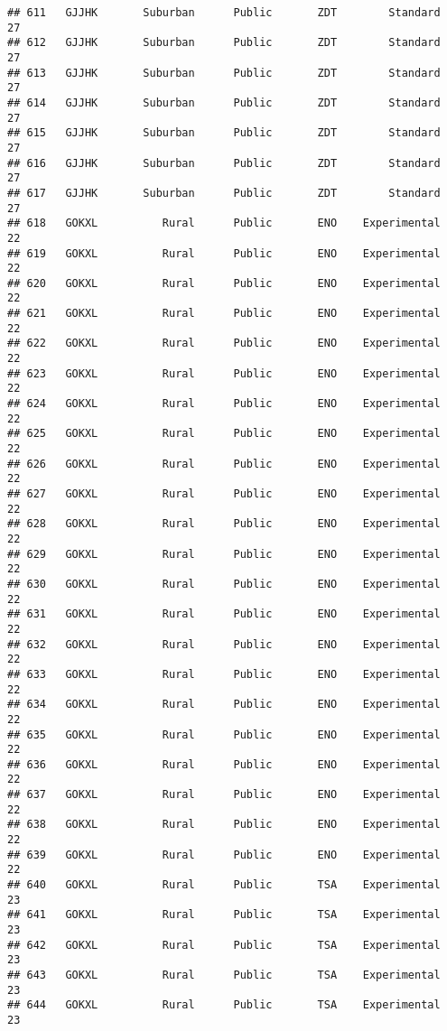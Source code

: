 \documentclass[
]{article}
\begin{document}
\begin{verbatim}
## 611   GJJHK       Suburban      Public       ZDT        Standard        27
## 612   GJJHK       Suburban      Public       ZDT        Standard        27
## 613   GJJHK       Suburban      Public       ZDT        Standard        27
## 614   GJJHK       Suburban      Public       ZDT        Standard        27
## 615   GJJHK       Suburban      Public       ZDT        Standard        27
## 616   GJJHK       Suburban      Public       ZDT        Standard        27
## 617   GJJHK       Suburban      Public       ZDT        Standard        27
## 618   GOKXL          Rural      Public       ENO    Experimental        22
## 619   GOKXL          Rural      Public       ENO    Experimental        22
## 620   GOKXL          Rural      Public       ENO    Experimental        22
## 621   GOKXL          Rural      Public       ENO    Experimental        22
## 622   GOKXL          Rural      Public       ENO    Experimental        22
## 623   GOKXL          Rural      Public       ENO    Experimental        22
## 624   GOKXL          Rural      Public       ENO    Experimental        22
## 625   GOKXL          Rural      Public       ENO    Experimental        22
## 626   GOKXL          Rural      Public       ENO    Experimental        22
## 627   GOKXL          Rural      Public       ENO    Experimental        22
## 628   GOKXL          Rural      Public       ENO    Experimental        22
## 629   GOKXL          Rural      Public       ENO    Experimental        22
## 630   GOKXL          Rural      Public       ENO    Experimental        22
## 631   GOKXL          Rural      Public       ENO    Experimental        22
## 632   GOKXL          Rural      Public       ENO    Experimental        22
## 633   GOKXL          Rural      Public       ENO    Experimental        22
## 634   GOKXL          Rural      Public       ENO    Experimental        22
## 635   GOKXL          Rural      Public       ENO    Experimental        22
## 636   GOKXL          Rural      Public       ENO    Experimental        22
## 637   GOKXL          Rural      Public       ENO    Experimental        22
## 638   GOKXL          Rural      Public       ENO    Experimental        22
## 639   GOKXL          Rural      Public       ENO    Experimental        22
## 640   GOKXL          Rural      Public       TSA    Experimental        23
## 641   GOKXL          Rural      Public       TSA    Experimental        23
## 642   GOKXL          Rural      Public       TSA    Experimental        23
## 643   GOKXL          Rural      Public       TSA    Experimental        23
## 644   GOKXL          Rural      Public       TSA    Experimental        23

\end{verbatim}
\end{document}

